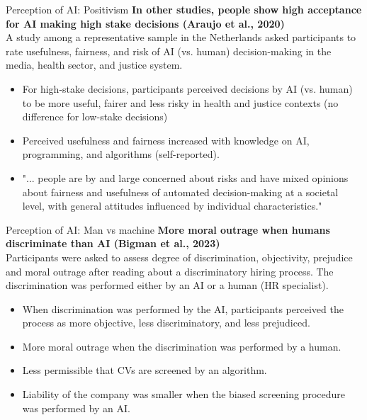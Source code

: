 \documentclass[8pt]{beamer}
\begin{document}
	\begin{frame}[t]{Perception of AI: Positivism}
		\textbf{In other studies, people show high acceptance for AI making high stake decisions (Araujo et al., 2020)}\\
		A study among a representative sample in the Netherlands asked participants to rate usefulness, fairness, and risk of AI (vs. human) decision-making in the media, health sector, and justice system.
		\begin{itemize}
			\item For high-stake decisions, participants perceived decisions by AI (vs. human) to be more useful, fairer and less risky in health and justice contexts (no difference for low-stake decisions)
			\item Perceived usefulness and fairness increased with knowledge on AI, programming, and algorithms (self-reported).
			\item "... people are by and large concerned about risks and have mixed opinions about fairness and usefulness of automated decision-making at a societal level, with general attitudes influenced by individual characteristics."
		\end{itemize}
	\end{frame}

	\begin{frame}[t]{Perception of AI: Man vs machine}
		\textbf{More moral outrage when humans discriminate than AI (Bigman et al., 2023)}\\
		Participants were asked to assess degree of discrimination, objectivity, prejudice and moral outrage after reading about a discriminatory hiring process. The discrimination was performed either by an AI or a human (HR specialist).
		\begin{itemize}
			\item When discrimination was performed by the AI, participants perceived the process as more objective, less discriminatory, and less prejudiced.
			\item <2> More moral outrage when the discrimination was performed by a human.
			\item <2> Less permissible that CVs are screened by an algorithm.
			\item <2> Liability of the company was smaller when the biased screening procedure was performed by an AI.
		\end{itemize}
	\end{frame}
\end{document}
